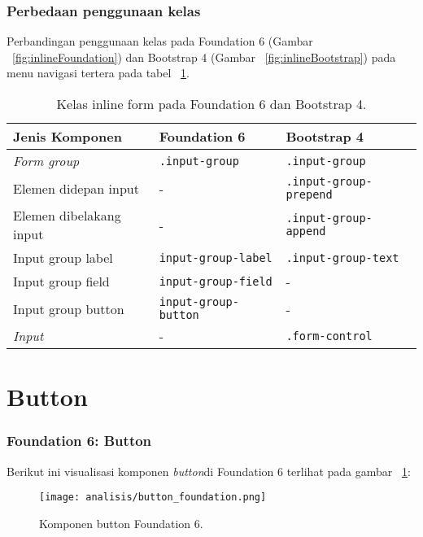\subsubsection{Perbedaan penggunaan kelas}
\noindent Perbandingan penggunaan kelas pada Foundation 6 (Gambar ~\ref{fig:inlineFoundation}) dan Bootstrap 4 (Gambar ~\ref{fig:inlineBootstrap}) pada menu navigasi tertera pada tabel ~\ref{table:inlineForm}.\\

\begin{table}[H] 
	\caption{Kelas inline form pada Foundation 6 dan Bootstrap 4.}
	\begin{tabular}{| p{} | p{} | p{} |} 
		\hline
		\textbf{Jenis Komponen} & \textbf{Foundation 6} & \textbf{Bootstrap 4}  \\ [0.5ex] 
		\hline	
		\textit{Form group} & \texttt{.input-group} & \texttt{.input-group}\\
		\hline
		Elemen didepan input & - & \texttt{.input-group-prepend}\\
		\hline
		Elemen dibelakang input & - & \texttt{.input-group-append}\\
		\hline
		Input group label & \texttt{input-group-label} & \texttt{.input-group-text}\\
		\hline
		Input group field & \texttt{input-group-field} & - \\
		\hline
		Input group button & \texttt{input-group-button} & -\\
		\hline
		\textit{Input} & - & \texttt{.form-control}\\ [1ex]
		\hline
	\end{tabular}
	\label{table:inlineForm}
\end{table}

\section{Button}
\subsubsection{Foundation 6: Button}
Berikut ini visualisasi komponen \textit{button}di Foundation 6 terlihat pada gambar ~\ref{fig:buttonFoundation}:
\begin{figure} [H]	
	\centering
	\texttt{[image: analisis/button\_foundation.png]}
	\caption{Komponen button Foundation 6.}
	\label{fig:buttonFoundation}
\end{figure}

